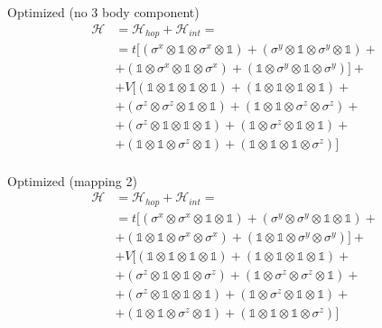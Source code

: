 \documentclass[twoside,twocolumn]{article}
\begin{document}
Optimized (no 3 body component)
\begin{equation}\label{eq:hubb_hamiltonian_solution_full}
\begin{aligned}
\mathcal{H} &= \mathcal{H}_{hop} + \mathcal{H}_{int} = \\
&= t [ (\sigma^x \otimes \mathbb{1} \otimes \sigma^x \otimes \mathbb{1}) + (\sigma^y \otimes \mathbb{1} \otimes \sigma^y \otimes \mathbb{1}) +\\
&+ (\mathbb{1} \otimes \sigma^x \otimes \mathbb{1} \otimes \sigma^x) + (\mathbb{1} \otimes \sigma^y \otimes \mathbb{1} \otimes \sigma^y) ] +\\
&+ V [ (\mathbb{1} \otimes \mathbb{1} \otimes \mathbb{1} \otimes \mathbb{1}) + (\mathbb{1} \otimes \mathbb{1} \otimes \mathbb{1} \otimes \mathbb{1}) +\\
&+ (\sigma^z \otimes \sigma^z \otimes \mathbb{1} \otimes \mathbb{1}) + (\mathbb{1} \otimes \mathbb{1} \otimes \sigma^z \otimes \sigma^z) +\\
&+ (\sigma^z \otimes \mathbb{1} \otimes \mathbb{1} \otimes \mathbb{1}) + (\mathbb{1} \otimes \sigma^z \otimes \mathbb{1} \otimes \mathbb{1}) +\\
&+ (\mathbb{1} \otimes \mathbb{1} \otimes \sigma^z \otimes \mathbb{1}) + (\mathbb{1} \otimes \mathbb{1} \otimes \mathbb{1} \otimes \sigma^z) ]
\end{aligned}
\end{equation}\\


Optimized (mapping 2)
\begin{equation}\label{eq:hubb_hamiltonian_solution_full}
\begin{aligned}
\mathcal{H} &= \mathcal{H}_{hop} + \mathcal{H}_{int} = \\
&= t [ (\sigma^x \otimes \sigma^x \otimes \mathbb{1} \otimes \mathbb{1}) + (\sigma^y \otimes \sigma^y \otimes \mathbb{1} \otimes \mathbb{1}) +\\
&+ (\mathbb{1} \otimes \mathbb{1} \otimes \sigma^x \otimes \sigma^x) + (\mathbb{1} \otimes \mathbb{1} \otimes \sigma^y \otimes \sigma^y) ] +\\
&+ V [ (\mathbb{1} \otimes \mathbb{1} \otimes \mathbb{1} \otimes \mathbb{1}) + (\mathbb{1} \otimes \mathbb{1} \otimes \mathbb{1} \otimes \mathbb{1}) +\\
&+ (\sigma^z \otimes \mathbb{1} \otimes \mathbb{1} \otimes \sigma^z) + (\mathbb{1} \otimes \sigma^z \otimes \sigma^z \otimes \mathbb{1}) +\\
&+ (\sigma^z \otimes \mathbb{1} \otimes \mathbb{1} \otimes \mathbb{1}) + (\mathbb{1} \otimes \sigma^z \otimes \mathbb{1} \otimes \mathbb{1}) +\\
&+ (\mathbb{1} \otimes \mathbb{1} \otimes \sigma^z \otimes \mathbb{1}) + (\mathbb{1} \otimes \mathbb{1} \otimes \mathbb{1} \otimes \sigma^z) ]
\end{aligned}
\end{equation}\\
\end{document}
